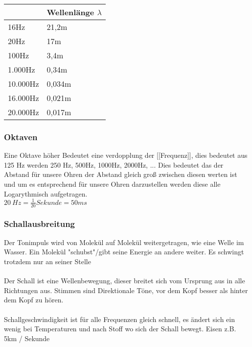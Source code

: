 \begin{table}[h]
\begin{center}
\begin{tabular}{l|l}
\hline
\rowcolor{YellowGreen!50!} \multicolumn{1}{|l|}{Frequenz} & \multicolumn{1}{l|}{Wellenlänge $\lambda$} \\ \hline
16Hz                           & 21,2m                                      \\
20Hz                           & 17m                                        \\
100Hz                          & 3,4m                                       \\
1.000Hz                        & 0,34m                                      \\
10.000Hz                       & 0,034m                                     \\
16.000Hz                       & 0,021m                                     \\
20.000Hz                       & 0,017m                                    
\end{tabular}
\end{center}
\end{table}
\newpage

    \subsubsection{Oktaven}
    Eine Oktave höher Bedeutet eine verdopplung der [[Frequenz]], dies bedeutet aus 125 Hz werden 250 Hz, 500Hz, 1000Hz, 2000Hz, ...
Dies bedeutet das der Abstand für unsere Ohren der Abstand gleich groß zwischen diesen werten ist und um es entsprechend für unsere Ohren darzustellen werden diese alle Logarythmisch aufgetragen. \\
$20~Hz = \frac{1}{20}Sekunde=50ms$


    \subsubsection{Schallausbreitung}
        Der Tonimpuls wird von Molekül auf Molekül weitergetragen, wie eine Welle im Wasser.  Ein Molekül "schubst"/gibt seine Energie an andere weiter. Es schwingt trotzdem nur an seiner Stelle\\~\\
Der Schall ist eine Wellenbewegung, dieser breitet sich vom Ursprung aus in alle Richtungen aus. Stimmen sind Direktionale Töne, vor dem Kopf besser als hinter dem Kopf zu hören. \\~\\
Schallgeschwindigkeit ist für alle Frequenzen gleich schnell, es ändert sich ein wenig bei Temperaturen und nach Stoff wo sich der Schall bewegt.
Eisen z.B. 5km / Sekunde

